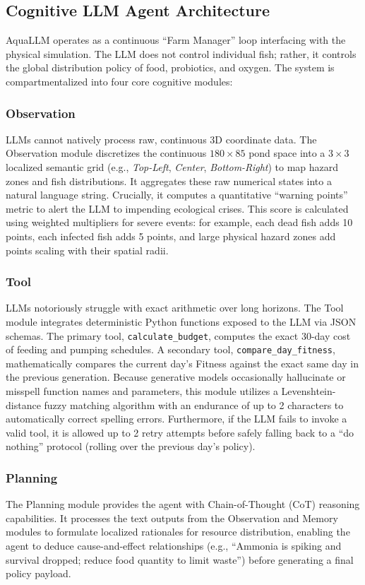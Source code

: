 \documentclass[conference]{IEEEtran}
\begin{document}
\subsection{Cognitive LLM Agent Architecture}
AquaLLM operates as a continuous ``Farm Manager'' loop interfacing with the physical simulation. The LLM does not control individual fish; rather, it controls the global distribution policy of food, probiotics, and oxygen. The system is compartmentalized into four core cognitive modules:

\subsubsection{Observation}
LLMs cannot natively process raw, continuous 3D coordinate data. The Observation module discretizes the continuous $180 \times 85$ pond space into a $3 \times 3$ localized semantic grid (e.g., \textit{Top-Left}, \textit{Center}, \textit{Bottom-Right}) to map hazard zones and fish distributions. It aggregates these raw numerical states into a natural language string. Crucially, it computes a quantitative ``warning points'' metric to alert the LLM to impending ecological crises. This score is calculated using weighted multipliers for severe events: for example, each dead fish adds 10 points, each infected fish adds 5 points, and large physical hazard zones add points scaling with their spatial radii.

\subsubsection{Tool}
LLMs notoriously struggle with exact arithmetic over long horizons. The Tool module integrates deterministic Python functions exposed to the LLM via JSON schemas. The primary tool, \texttt{calculate\_budget}, computes the exact 30-day cost of feeding and pumping schedules. A secondary tool, \texttt{compare\_day\_fitness}, mathematically compares the current day's Fitness against the exact same day in the previous generation. Because generative models occasionally hallucinate or misspell function names and parameters, this module utilizes a Levenshtein-distance fuzzy matching algorithm with an endurance of up to 2 characters to automatically correct spelling errors. Furthermore, if the LLM fails to invoke a valid tool, it is allowed up to 2 retry attempts before safely falling back to a ``do nothing'' protocol (rolling over the previous day's policy).

\subsubsection{Planning}
The Planning module provides the agent with Chain-of-Thought (CoT) reasoning capabilities. It processes the text outputs from the Observation and Memory modules to formulate localized rationales for resource distribution, enabling the agent to deduce cause-and-effect relationships (e.g., ``Ammonia is spiking and survival dropped; reduce food quantity to limit waste'') before generating a final policy payload. 
\end{document}
